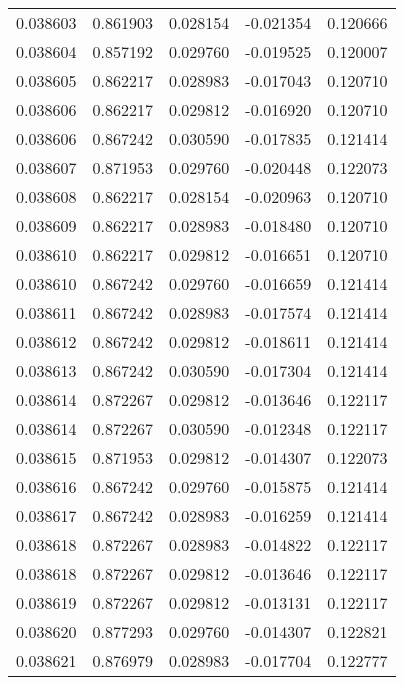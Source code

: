 \begin{tabular}{lrrrr}
0.038603    &  0.861903 &  0.028154 & -0.021354 &             0.120666 \\
0.038604    &  0.857192 &  0.029760 & -0.019525 &             0.120007 \\
0.038605    &  0.862217 &  0.028983 & -0.017043 &             0.120710 \\
0.038606    &  0.862217 &  0.029812 & -0.016920 &             0.120710 \\
0.038606    &  0.867242 &  0.030590 & -0.017835 &             0.121414 \\
0.038607    &  0.871953 &  0.029760 & -0.020448 &             0.122073 \\
0.038608    &  0.862217 &  0.028154 & -0.020963 &             0.120710 \\
0.038609    &  0.862217 &  0.028983 & -0.018480 &             0.120710 \\
0.038610    &  0.862217 &  0.029812 & -0.016651 &             0.120710 \\
0.038610    &  0.867242 &  0.029760 & -0.016659 &             0.121414 \\
0.038611    &  0.867242 &  0.028983 & -0.017574 &             0.121414 \\
0.038612    &  0.867242 &  0.029812 & -0.018611 &             0.121414 \\
0.038613    &  0.867242 &  0.030590 & -0.017304 &             0.121414 \\
0.038614    &  0.872267 &  0.029812 & -0.013646 &             0.122117 \\
0.038614    &  0.872267 &  0.030590 & -0.012348 &             0.122117 \\
0.038615    &  0.871953 &  0.029812 & -0.014307 &             0.122073 \\
0.038616    &  0.867242 &  0.029760 & -0.015875 &             0.121414 \\
0.038617    &  0.867242 &  0.028983 & -0.016259 &             0.121414 \\
0.038618    &  0.872267 &  0.028983 & -0.014822 &             0.122117 \\
0.038618    &  0.872267 &  0.029812 & -0.013646 &             0.122117 \\
0.038619    &  0.872267 &  0.029812 & -0.013131 &             0.122117 \\
0.038620    &  0.877293 &  0.029760 & -0.014307 &             0.122821 \\
0.038621    &  0.876979 &  0.028983 & -0.017704 &             0.122777 \\

\end{tabular}
